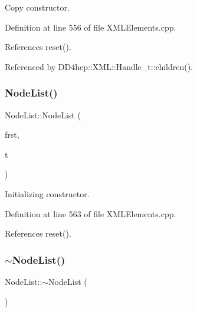 Copy constructor. 



Definition at line 556 of file X\+M\+L\+Elements.\+cpp.



References reset().



Referenced by D\+D4hep\+::\+X\+M\+L\+::\+Handle\+\_\+t\+::children().

\hypertarget{class_d_d4hep_1_1_x_m_l_1_1_node_list_a8711c5612f382425754b2b8d7b01a7dc}{}\label{class_d_d4hep_1_1_x_m_l_1_1_node_list_a8711c5612f382425754b2b8d7b01a7dc} 
\subsubsection{\texorpdfstring{Node\+List()}{NodeList()}\hspace{0.1cm}{\footnotesize\ttfamily [2/2]}}
{\footnotesize\ttfamily Node\+List\+::\+Node\+List (\begin{DoxyParamCaption}\item[{Xml\+Element $\ast$}]{frst,  }\item[{const \hyperlink{namespace_d_d4hep_1_1_x_m_l_a09e5d9cc86ed782f6826dfe0778c1815}{Xml\+Char} $\ast$}]{t }\end{DoxyParamCaption})}



Initializing constructor. 



Definition at line 563 of file X\+M\+L\+Elements.\+cpp.



References reset().

\hypertarget{class_d_d4hep_1_1_x_m_l_1_1_node_list_a77b664c0c6c93d1c6eccbd10581396af}{}\label{class_d_d4hep_1_1_x_m_l_1_1_node_list_a77b664c0c6c93d1c6eccbd10581396af} 
\subsubsection{\texorpdfstring{$\sim$\+Node\+List()}{~NodeList()}}
{\footnotesize\ttfamily Node\+List\+::$\sim$\+Node\+List (\begin{DoxyParamCaption}{ }\end{DoxyParamCaption})}



